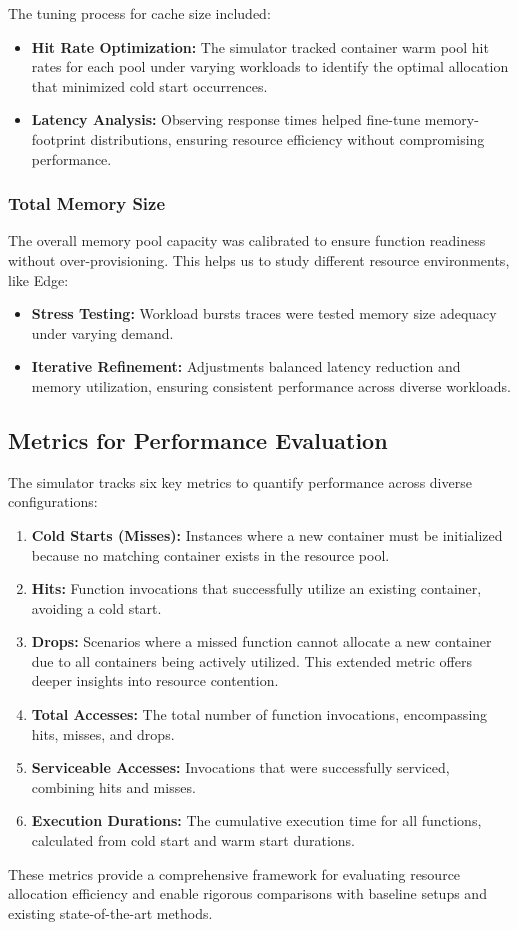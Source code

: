 The tuning process for cache size included:
\begin{itemize}
    \item \textbf{Hit Rate Optimization:} The simulator tracked container warm pool hit rates for each pool under varying workloads to identify the optimal allocation that minimized cold start occurrences.
    \item \textbf{Latency Analysis:} Observing response times helped fine-tune memory-footprint distributions, ensuring resource efficiency without compromising performance.
\end{itemize}

\subsubsection{Total Memory Size}
The overall memory pool capacity was calibrated to ensure function readiness without over-provisioning. This helps us to study different resource environments, like Edge:
\begin{itemize}
    \item \textbf{Stress Testing:} Workload bursts traces were tested memory size adequacy under varying demand.
    \item \textbf{Iterative Refinement:} Adjustments balanced latency reduction and memory utilization, ensuring consistent performance across diverse workloads.
\end{itemize}


\subsection{Metrics for Performance Evaluation}
The simulator tracks six key metrics to quantify performance across diverse configurations:
\begin{enumerate}
    \item \textbf{Cold Starts (Misses):} Instances where a new container must be initialized because no matching container exists in the resource pool.
    \item \textbf{Hits:}  Function invocations that successfully utilize an existing container, avoiding a cold start.
    \item \textbf{Drops:} Scenarios where a missed function cannot allocate a new container due to all containers being actively utilized. This extended metric offers deeper insights into resource contention.
    \item \textbf{Total Accesses:} The total number of function invocations, encompassing hits, misses, and drops.
    \item \textbf{Serviceable Accesses:} Invocations that were successfully serviced, combining hits and misses.
    \item \textbf{Execution Durations:} The cumulative execution time for all functions, calculated from cold start and warm start durations.
\end{enumerate}

These metrics provide a comprehensive framework for evaluating resource allocation efficiency and enable rigorous comparisons with baseline setups and existing state-of-the-art methods.

